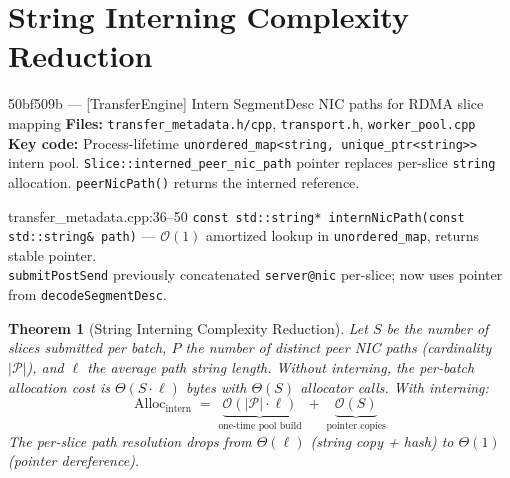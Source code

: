\documentclass[11pt,a4paper,twoside]{article}
\theoremstyle{plain}
\newtheorem{theorem}{Theorem}[section]
\theoremstyle{definition}
\theoremstyle{remark}
\newcommand{\BigO}{\mathcal{O}}
\begin{document}
\section{String Interning Complexity Reduction}
\label{sec:string-intern}

\begin{commitbox}{50bf509b --- [TransferEngine] Intern SegmentDesc NIC paths for RDMA
slice mapping}
\textbf{Files:} \texttt{transfer\_metadata.h/cpp}, \texttt{transport.h},
\texttt{worker\_pool.cpp}\\
\textbf{Key code:} Process-lifetime \texttt{unordered\_map<string, unique\_ptr<string>>}
intern pool. \texttt{Slice::interned\_peer\_nic\_path} pointer replaces per-slice
\texttt{string} allocation. \texttt{peerNicPath()} returns the interned reference.
\end{commitbox}

\begin{codeline}{transfer\_metadata.cpp:36--50}
\texttt{const std::string* internNicPath(const std::string\& path)} ---
$\BigO(1)$ amortized lookup in \texttt{unordered\_map}, returns stable pointer.\\
\texttt{submitPostSend} previously concatenated \texttt{server@nic} per-slice; now uses
pointer from \texttt{decodeSegmentDesc}.
\end{codeline}

\begin{theorem}[String Interning Complexity Reduction]
\label{thm:string-intern}
Let $S$ be the number of slices submitted per batch, $P$ the number of distinct
peer NIC paths (cardinality $|\mathcal{P}|$), and $\ell$ the average path string length.
Without interning, the per-batch allocation cost is $\Theta(S \cdot \ell)$ bytes with
$\Theta(S)$ allocator calls.  With interning:
\begin{equation}
  \text{Alloc}_{\text{intern}} \;=\;
  \underbrace{\BigO(|\mathcal{P}| \cdot \ell)}_{\text{one-time pool build}} \;+\;
  \underbrace{\BigO(S)}_{\text{pointer copies}}
  \label{eq:intern-cost}
\end{equation}
The per-slice path resolution drops from $\Theta(\ell)$ (string copy + hash) to
$\Theta(1)$ (pointer dereference).
\end{theorem}
\end{document}
